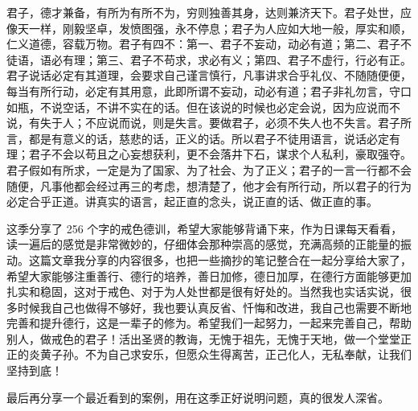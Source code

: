 君子，德才兼备，有所为有所不为，穷则独善其身，达则兼济天下。君子处世，应像天一样，刚毅坚卓，发愤图强，永不停息；君子为人应如大地一般，厚实和顺，仁义道德，容载万物。君子有四不：第一、君子不妄动，动必有道；第二、君子不徒语，语必有理；第三、君子不苟求，求必有义；第四、君子不虚行，行必有正。君子说话必定有其道理，会要求自己谨言慎行，凡事讲求合乎礼仪、不随随便便，每当有所行动，必定有其用意，此即所谓不妄动，动必有道；君子非礼勿言，守口如瓶，不说空话，不讲不实在的话。但在该说的时候也必定会说，因为应说而不说，有失于人；不应说而说，则是失言。要做君子，必须不失人也不失言。君子所言，都是有意义的话，慈悲的话，正义的话。所以君子不徒用语言，说话必定有理；君子不会以苟且之心妄想获利，更不会落井下石，谋求个人私利，豪取强夺。君子假如有所求，一定是为了国家、为了社会、为了正义；君子的一言一行都不会随便，凡事他都会经过再三的考虑，想清楚了，他才会有所行动，所以君子的行为必定合乎正道。讲真实的语言，起正直的念头，说正直的话、做正直的事。

这季分享了 256 个字的戒色德训，希望大家能够背诵下来，作为日课每天看看，读一遍后的感觉是非常微妙的，仔细体会那种崇高的感觉，充满高频的正能量的振动。这篇文章我分享的内容很多，也把一些摘抄的笔记整合在一起分享给大家了，希望大家能够注重善行、德行的培养，善日加修，德日加厚，在德行方面能够更加扎实和稳固，这对于戒色、对于为人处世都是很有好处的。当然我也实话实说，很多时候我自己也做得不够好，我也要认真反省、忏悔和改进，我自己也需要不断地完善和提升德行，这是一辈子的修为。希望我们一起努力，一起来完善自己，帮助别人，做戒色的君子！活出圣贤的教诲，无愧于祖先，无愧于天地，做一个堂堂正正的炎黄子孙。不为自己求安乐，但愿众生得离苦，正己化人，无私奉献，让我们坚持到底！

最后再分享一个最近看到的案例，用在这季正好说明问题，真的很发人深省。

